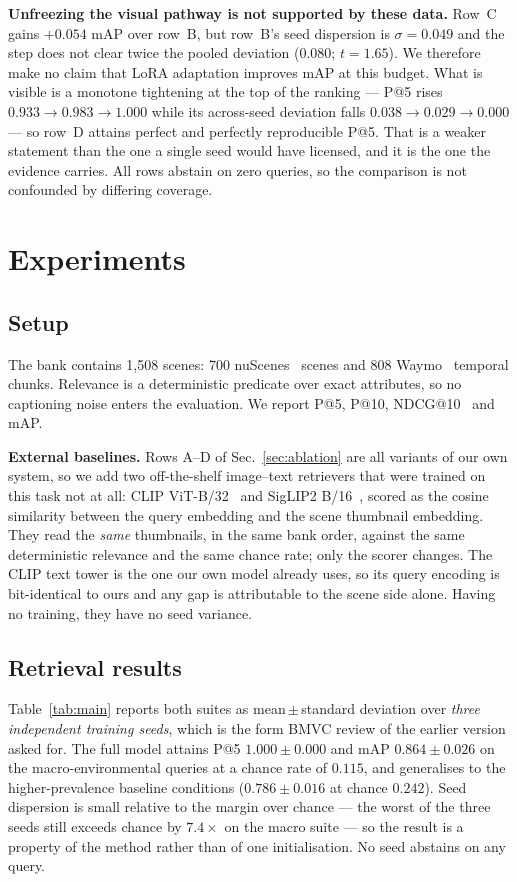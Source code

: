 \documentclass[10pt,twocolumn,letterpaper]{article}
\begin{document}
\noindent\textbf{Unfreezing the visual pathway is not supported by these
data.} Row~C gains $+0.054$ mAP over row~B, but row~B's seed dispersion is
$\sigma=0.049$ and the step does not clear twice the pooled deviation
($0.080$; $t=1.65$). We therefore make no claim that LoRA adaptation improves
mAP at this budget. What is visible is a monotone tightening at the top of
the ranking --- P@5 rises $0.933\!\rightarrow\!0.983\!\rightarrow\!1.000$
while its across-seed deviation falls $0.038\!\rightarrow\!0.029\!\rightarrow
\!0.000$ --- so row~D attains perfect and perfectly reproducible P@5. That is
a weaker statement than the one a single seed would have licensed, and it is
the one the evidence carries. All rows abstain on zero queries, so the
comparison is not confounded by differing coverage.

\section{Experiments}
\label{sec:exp}
\subsection{Setup}
The bank contains 1{,}508 scenes: 700 nuScenes~\cite{nuscenes} scenes and
808 Waymo~\cite{waymo} temporal chunks. Relevance is a deterministic
predicate over exact attributes, so no captioning noise enters the
evaluation. We report P@5, P@10, NDCG@10~\cite{ndcg} and mAP.

\noindent\textbf{External baselines.} Rows A--D of Sec.~\ref{sec:ablation}
are all variants of our own system, so we add two off-the-shelf image--text
retrievers that were trained on this task not at all: CLIP
ViT-B/32~\cite{clip} and SigLIP2 B/16~\cite{siglip}, scored as the cosine
similarity between the query embedding and the scene thumbnail embedding.
They read the \emph{same} thumbnails, in the same bank order, against the
same deterministic relevance and the same chance rate; only the scorer
changes. The CLIP text tower is the one our own model already uses, so its
query encoding is bit-identical to ours and any gap is attributable to the
scene side alone. Having no training, they have no seed variance.

\subsection{Retrieval results}
Table~\ref{tab:main} reports both suites as mean\,$\pm$\,standard deviation
over \emph{three independent training seeds}, which is the form BMVC review
of the earlier version asked for. The full model attains P@5
$1.000\!\pm\!0.000$ and mAP $0.864\!\pm\!0.026$ on the macro-environmental
queries at a chance rate of $0.115$, and generalises to the
higher-prevalence baseline conditions ($0.786\!\pm\!0.016$ at chance
$0.242$). Seed dispersion is small relative to the margin over chance --- the
worst of the three seeds still exceeds chance by $7.4\times$ on the macro
suite --- so the result is a property of the method rather than of one
initialisation. No seed abstains on any query.
\end{document}
